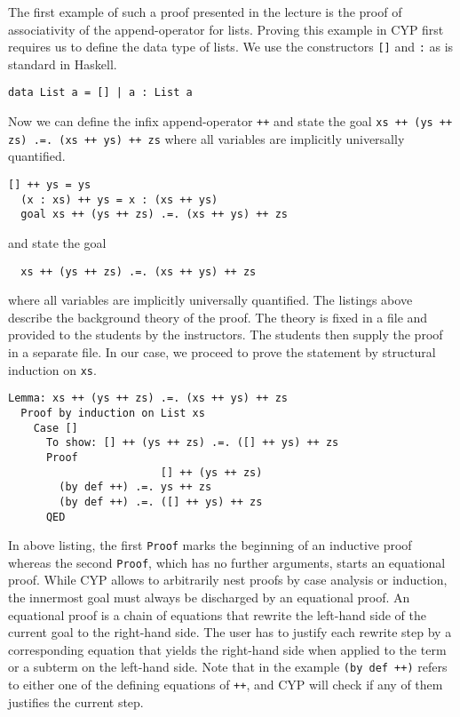 The first example of such a proof presented in the lecture is the proof of associativity of the append-operator for lists.
Proving this example in CYP first requires us
to define the data type of lists.
We use
the constructors \lstinline[style=cyp]![]! and \lstinline[style=cyp]!:!
as is standard in Haskell.
\begin{lstlisting}[style=cyp]
  data List a = [] | a : List a
\end{lstlisting}
Now we can define the infix append-operator \lstinline[style=cyp]!++! and state the goal \lstinline[style=cyp]!xs ++ (ys ++ zs) .=. (xs ++ ys) ++ zs! where all variables are implicitly universally quantified.
\begin{lstlisting}[style=cyp]
  [] ++ ys = ys
  (x : xs) ++ ys = x : (xs ++ ys)
  goal xs ++ (ys ++ zs) .=. (xs ++ ys) ++ zs
\end{lstlisting}
and state the goal
\begin{lstlisting}
  xs ++ (ys ++ zs) .=. (xs ++ ys) ++ zs
\end{lstlisting}
where all variables are implicitly universally quantified.
The listings above describe the background theory of the proof.
The theory is fixed in a file and provided
to the students by the instructors.
The students then supply the proof in a separate file.
In our case, we proceed to prove the statement by structural induction on \lstinline[style=cyp]!xs!.
\begin{lstlisting}[style=cyp]
  Lemma: xs ++ (ys ++ zs) .=. (xs ++ ys) ++ zs
  Proof by induction on List xs
    Case []
      To show: [] ++ (ys ++ zs) .=. ([] ++ ys) ++ zs
      Proof
                        [] ++ (ys ++ zs)
        (by def ++) .=. ys ++ zs
        (by def ++) .=. ([] ++ ys) ++ zs
      QED
\end{lstlisting}
In above listing, the first \lstinline[style=cyp]!Proof! marks the beginning of an inductive proof whereas the second \lstinline[style=cyp]!Proof!, which has no further arguments, starts an equational proof.
While CYP allows to arbitrarily nest proofs
by case analysis or induction,
the innermost goal must always be discharged by an equational proof.
An equational proof is a chain of equations that rewrite the left-hand side of the current goal to the right-hand side.
The user has to justify each rewrite step by a corresponding equation that yields the right-hand side
when applied to the term or a subterm on the left-hand side.
Note that in the example \lstinline[style=cyp]!(by def ++)! refers to either one of the defining equations of \lstinline[style=cyp]!++!,
and CYP will check if any of them justifies the current step.

